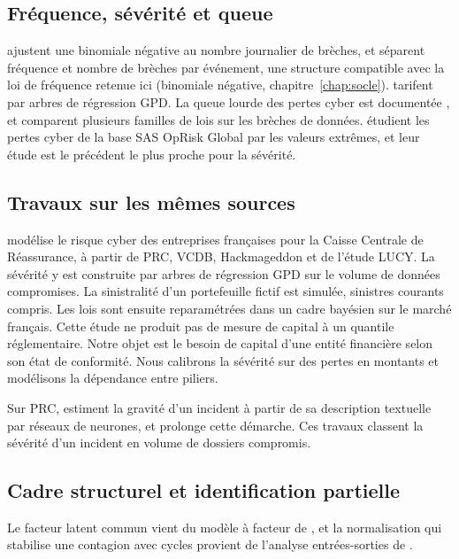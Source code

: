 \subsection*{Fréquence, sévérité et queue}
\citet{Edwards2016} ajustent une binomiale négative au
nombre journalier de brèches, et \citet{LuZhangZhu2024} séparent fréquence et nombre de brèches par
événement, une structure compatible avec la loi de fréquence retenue ici (binomiale négative, chapitre~\ref{chap:socle}). \citet{FarkasLopezThomas2021}
tarifent par arbres de régression GPD. La queue lourde des pertes cyber est documentée
\citep{MaillartSornette2010, wheatley2016}, et \citet{elingloperfido2017} comparent plusieurs
familles de lois sur les brèches de données. \citet{elingwirfs2019} étudient les pertes cyber de la
base SAS OpRisk Global par les valeurs extrêmes, et leur étude est le précédent le plus proche pour la sévérité.

\subsection*{Travaux sur les mêmes sources}
\citet{Ranguin2024} modélise le risque cyber des
entreprises françaises pour la Caisse Centrale de Réassurance, à partir de PRC, VCDB, Hackmageddon et
de l'étude LUCY. La sévérité y est construite par arbres de régression GPD sur le volume de données
compromises. La sinistralité d'un portefeuille fictif est simulée, sinistres courants compris. Les lois
sont ensuite reparamétrées dans un cadre bayésien sur le marché français. Cette étude ne produit pas de
mesure de capital à un quantile réglementaire. Notre objet est le besoin de capital d'une
entité financière selon son état de conformité. Nous calibrons la sévérité sur des pertes en montants et
modélisons la dépendance entre piliers.

Sur PRC, \citet{KherLopezRapior2023} estiment la gravité d'un incident à partir de sa description
textuelle par réseaux de neurones, et \citet{Dountio2026} prolonge cette démarche. Ces travaux
classent la sévérité d'un incident en volume de dossiers compromis.

\subsection*{Cadre structurel et identification partielle}
Le facteur latent commun vient du modèle à facteur de \citet{Vasicek2002}, et la normalisation qui stabilise une contagion avec
cycles provient de l'analyse entrées-sorties de \citet{Leontief1936}.

